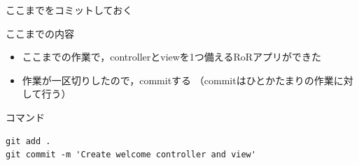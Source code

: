 \documentclass[t, aspectratio=169]{beamer}
\begin{document}
\begin{frame}[fragile,label=sec-6-2-5]{ここまでをコミットしておく}
 \begin{block}{ここまでの内容}
\begin{itemize}
\item ここまでの作業で，controllerとviewを1つ備えるRoRアプリができた
\item 作業が一区切りしたので，commitする
（commitはひとかたまりの作業に対して行う）
\end{itemize}
\end{block}

\begin{block}{コマンド}
\begin{verbatim}
git add .
git commit -m 'Create welcome controller and view'
\end{verbatim}
\end{block}
\end{frame}
\end{document}
